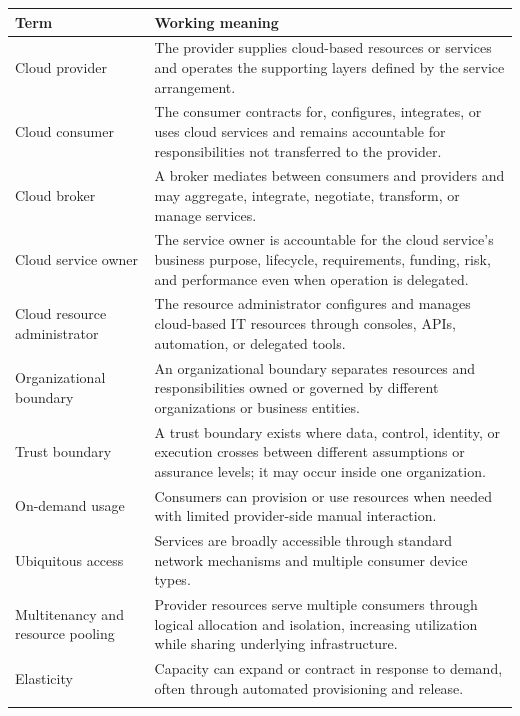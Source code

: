 \documentclass[11pt]{article}
\begin{document}
\begin{longtable}{@{}>{\RaggedRight\arraybackslash}p{}>{\RaggedRight\arraybackslash}p{}@{}}
\toprule\rowcolor{Navy}\color{white}\textbf{Term} & \color{white}\textbf{Working meaning}\\\midrule\endhead
Cloud provider & The provider supplies cloud-based resources or services and operates the supporting layers defined by the service arrangement. \\\addlinespace[2pt]
Cloud consumer & The consumer contracts for, configures, integrates, or uses cloud services and remains accountable for responsibilities not transferred to the provider. \\\addlinespace[2pt]
Cloud broker & A broker mediates between consumers and providers and may aggregate, integrate, negotiate, transform, or manage services. \\\addlinespace[2pt]
Cloud service owner & The service owner is accountable for the cloud service's business purpose, lifecycle, requirements, funding, risk, and performance even when operation is delegated. \\\addlinespace[2pt]
Cloud resource administrator & The resource administrator configures and manages cloud-based IT resources through consoles, APIs, automation, or delegated tools. \\\addlinespace[2pt]
Organizational boundary & An organizational boundary separates resources and responsibilities owned or governed by different organizations or business entities. \\\addlinespace[2pt]
Trust boundary & A trust boundary exists where data, control, identity, or execution crosses between different assumptions or assurance levels; it may occur inside one organization. \\\addlinespace[2pt]
On-demand usage & Consumers can provision or use resources when needed with limited provider-side manual interaction. \\\addlinespace[2pt]
Ubiquitous access & Services are broadly accessible through standard network mechanisms and multiple consumer device types. \\\addlinespace[2pt]
Multitenancy and resource pooling & Provider resources serve multiple consumers through logical allocation and isolation, increasing utilization while sharing underlying infrastructure. \\\addlinespace[2pt]
Elasticity & Capacity can expand or contract in response to demand, often through automated provisioning and release. \\\addlinespace[2pt]

\end{longtable}
\end{document}
